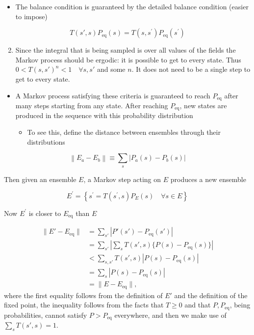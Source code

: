 \begin{itemize}
  \item The balance condition is guaranteed by the detailed balance condition (easier to impose)
\end{itemize}

\begin{equation}
T(s', s) P_{\text{eq}}(s)=T\left(s, s^{\prime}\right) P_{\text{eq}}\left(s^{\prime}\right)
\end{equation}

\begin{enumerate}
  \setcounter{enumi}{1}
  \item Since the integral that is being sampled is over all values of the fields the Markov process should be ergodic: it is possible to get to every state. Thus $0 < T(s, s')^n < 1 \quad \forall s,s'$ and some $n$. It does not need to be a single step to get to every state.
\end{enumerate}
\begin{itemize}
    \item A Markov process satisfying these criteria is guaranteed to reach $P_\text{eq}$ after many steps starting from any state. After reaching $P_\text{eq}$, new states are produced in the sequence with this probability distribution
    \begin{itemize}
        \item To see this, define the distance between ensembles through their distributions
    \end{itemize}
\end{itemize}

\begin{equation}
\left\|E_{a}-E_{b}\right\| \equiv \sum_{s}\left|P_{a}(s)-P_{b}(s)\right|
\end{equation}

Then given an ensemble \(E\), a Markov step acting on \(E\) produces a new ensemble

\begin{equation}
E^{\prime}=\left\{s^{\prime}=T\left(s^{\prime}, s\right) P_{E}(s) \quad \forall s \in E\right\}
\end{equation}

Now \(E^{\prime}\) is closer to \(E_\text{eq}\) than \(E\)

\begin{align}
    \|E' - E_\text{eq}\| &= \sum_{s'} |P'(s') - P_\text{eq}(s')| \nonumber \\ 
    &=\sum_{s'}\left|\sum_s T(s',s)\{P(s) - P_\text{eq}(s)\}\right| \nonumber \\
    &< \sum_{s,s'}T(s',s)|P(s) - P_\text{eq}(s)| \nonumber \\
    &= \sum_s |P(s) - P_\text{eq}(s)| \nonumber \\
    &= \|E - E_\text{eq}\|,
\end{align}
where the first equality follows from the definition of $E'$ and the definition of the fixed point, the inequality follows from the facts that $T\geq 0$ and that $P, P_\text{eq}$, being probabilities, cannot satisfy $P > P_\text{eq}$ everywhere, and then we make use of $\sum_sT(s',s) = 1$.

